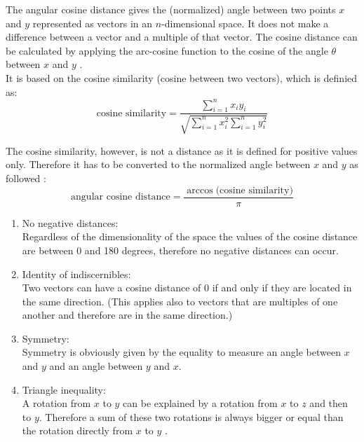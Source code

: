 The angular cosine distance gives the (normalized) angle between two points $x$ and $y$ represented as vectors in an $n$-dimensional space. It does not make a difference between a vector and a multiple of that vector. The cosine distance can be calculated by applying the arc-cosine function to the cosine of the angle $\theta$ between $x$ and $y$ \cite{MMDS}. \\
It is based on the cosine similarity (cosine between two vectors), which is definied as: \\

\begin{equation}
	\text{cosine similarity} = \frac{\sum_{i=1}^{n} x_i y_i}{\sqrt{\sum_{i=1}^{n} x_i^2 \sum_{i=1}^{n} y_i^2}}
\end{equation}  

The cosine similarity, however, is not a distance as it is defined for positive values only. Therefore it has to be converted to the normalized angle between $x$ and $y$ as followed \cite{cosdist}: \\

\begin{equation}
	\text{angular cosine distance} = \frac{\arccos({\text{cosine similarity})}}{\pi}
\end{equation}  


\begin{enumerate}
	\item No negative distances:\\
	Regardless of the dimensionality of the space the values of the cosine distance are between 0 and 180 degrees, therefore no negative distances can occur. 
	\item Identity of indiscernibles:\\
	Two vectors can have a cosine distance of 0 if and only if they are located in the same direction. (This applies also to vectors that are multiples of one another and therefore are in the same direction.) 
	\item Symmetry: \\
	Symmetry is obviously given by the equality to measure an angle between $x$ and $y$ and an angle between $y$ and $x$. 
	\item Triangle inequality: \\
	A rotation from $x$ to $y$ can be explained by a rotation from $x$ to $z$ and then to $y$. Therefore a sum of these two rotations is always bigger or equal than the rotation directly from $x$ to $y$ \cite{MMDS}. 
\end{enumerate}


